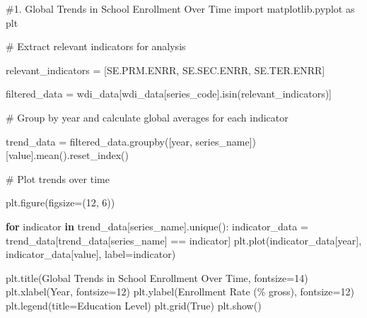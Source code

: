 \documentclass[
  letterpaper,
  DIV=11,
  numbers=noendperiod]{scrartcl}
\newenvironment{Shaded}{\begin{snugshade}}{\end{snugshade}}
\newcommand{\CommentTok}[1]{\textcolor[rgb]{0.37,0.37,0.37}{#1}}
\newcommand{\ControlFlowTok}[1]{\textcolor[rgb]{0.00,0.23,0.31}{\textbf{#1}}}
\newcommand{\DecValTok}[1]{\textcolor[rgb]{0.68,0.00,0.00}{#1}}
\newcommand{\ImportTok}[1]{\textcolor[rgb]{0.00,0.46,0.62}{#1}}
\newcommand{\KeywordTok}[1]{\textcolor[rgb]{0.00,0.23,0.31}{\textbf{#1}}}
\newcommand{\NormalTok}[1]{\textcolor[rgb]{0.00,0.23,0.31}{#1}}
\newcommand{\OperatorTok}[1]{\textcolor[rgb]{0.37,0.37,0.37}{#1}}
\newcommand{\SpecialCharTok}[1]{\textcolor[rgb]{0.37,0.37,0.37}{#1}}
\newcommand{\StringTok}[1]{\textcolor[rgb]{0.13,0.47,0.30}{#1}}
\newcommand{\VariableTok}[1]{\textcolor[rgb]{0.07,0.07,0.07}{#1}}
\begin{document}
\begin{Shaded}
\begin{Highlighting}[]
\CommentTok{\#1. Global Trends in School Enrollment Over Time}
\ImportTok{import}\NormalTok{ matplotlib.pyplot }\ImportTok{as}\NormalTok{ plt}

\CommentTok{\# Extract relevant indicators for analysis}

\NormalTok{relevant\_indicators }\OperatorTok{=}\NormalTok{ [}\StringTok{\textquotesingle{}SE.PRM.ENRR\textquotesingle{}}\NormalTok{, }\StringTok{\textquotesingle{}SE.SEC.ENRR\textquotesingle{}}\NormalTok{, }\StringTok{\textquotesingle{}SE.TER.ENRR\textquotesingle{}}\NormalTok{]}

\NormalTok{filtered\_data }\OperatorTok{=}\NormalTok{ wdi\_data[wdi\_data[}\StringTok{\textquotesingle{}series\_code\textquotesingle{}}\NormalTok{].isin(relevant\_indicators)]}

\CommentTok{\# Group by year and calculate global averages for each indicator}

\NormalTok{trend\_data }\OperatorTok{=}\NormalTok{ filtered\_data.groupby([}\StringTok{\textquotesingle{}year\textquotesingle{}}\NormalTok{, }\StringTok{\textquotesingle{}series\_name\textquotesingle{}}\NormalTok{])[}\StringTok{\textquotesingle{}value\textquotesingle{}}\NormalTok{].mean().reset\_index()}

\CommentTok{\# Plot trends over time}

\NormalTok{plt.figure(figsize}\OperatorTok{=}\NormalTok{(}\DecValTok{12}\NormalTok{, }\DecValTok{6}\NormalTok{))}

\ControlFlowTok{for}\NormalTok{ indicator }\KeywordTok{in}\NormalTok{ trend\_data[}\StringTok{\textquotesingle{}series\_name\textquotesingle{}}\NormalTok{].unique():}
\NormalTok{    indicator\_data }\OperatorTok{=}\NormalTok{ trend\_data[trend\_data[}\StringTok{\textquotesingle{}series\_name\textquotesingle{}}\NormalTok{] }\OperatorTok{==}\NormalTok{ indicator]}
\NormalTok{    plt.plot(indicator\_data[}\StringTok{\textquotesingle{}year\textquotesingle{}}\NormalTok{], indicator\_data[}\StringTok{\textquotesingle{}value\textquotesingle{}}\NormalTok{], label}\OperatorTok{=}\NormalTok{indicator)}

\NormalTok{plt.title(}\StringTok{\textquotesingle{}Global Trends in School Enrollment Over Time\textquotesingle{}}\NormalTok{, fontsize}\OperatorTok{=}\DecValTok{14}\NormalTok{)}
\NormalTok{plt.xlabel(}\StringTok{\textquotesingle{}Year\textquotesingle{}}\NormalTok{, fontsize}\OperatorTok{=}\DecValTok{12}\NormalTok{)}
\NormalTok{plt.ylabel(}\StringTok{\textquotesingle{}Enrollment Rate (}\SpecialCharTok{\% g}\StringTok{ross)\textquotesingle{}}\NormalTok{, fontsize}\OperatorTok{=}\DecValTok{12}\NormalTok{)}
\NormalTok{plt.legend(title}\OperatorTok{=}\StringTok{\textquotesingle{}Education Level\textquotesingle{}}\NormalTok{)}
\NormalTok{plt.grid(}\VariableTok{True}\NormalTok{)}
\NormalTok{plt.show()}
\end{Highlighting}
\end{Shaded}
\end{document}

